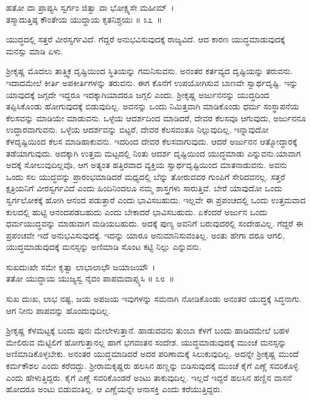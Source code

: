 \begin{shloka}
ಹತೋ ವಾ ಪ್ರಾಪ್ಯಸಿ ಸ್ವರ್ಗಂ ಜಿತ್ವಾ ವಾ ಭೋಕ್ಷ್ಯಸೇ ಮಹೀಮ್~।\\ತಸ್ಮಾದುತ್ತಿಷ್ಠ ಕೌಂತೇಯ ಯುದ್ಧಾಯ ಕೃತನಿಶ್ಚಯಃ \hfill॥ ೩೭~॥
\end{shloka}

\begin{artha}
ಯುದ್ಧದಲ್ಲಿ ಸತ್ತರೆ ವೀರಸ್ವರ್ಗವಿದೆ. ಗೆದ್ದರೆ ಅನುಭವಿಸುವುದಕ್ಕೆ ರಾಜ್ಯವಿದೆ. ಆದ ಕಾರಣ ಯುದ್ಧಮಾಡುವುದಕ್ಕೆ ಮನಸ್ಸು ಮಾಡಿ ಏಳು.
\end{artha}

\newpage

ಶ‍್ರೀಕೃಷ್ಣ ಮೊದಲು ತಾತ್ತ್ವಿಕ ದೃಷ್ಟಿಯಿಂದ ಸ್ಥಿತಿಯನ್ನು ಗಮನಿಸುವನು. ಅನಂತರ ಕರ್ತವ್ಯದ ದೃಷ್ಟಿಯನ್ನು ತರುವನು. ಇದಾದಮೇಲೆ ಕೀರ್ತಿ ಅಪಕೀರ್ತಿಗಳನ್ನು ತರುವನು. ಈಗ ಕೊನೆಗೆ ಉಪಯೋಗಿಸುವ ಬಾಣವೇ ಸ್ವಾರ್ಥದೃಷ್ಟಿ. ಇನ್ನು ಯಾವುದಕ್ಕೆ ಜಗ್ಗದೇ ಇದ್ದರೂ ಇದಕ್ಕಾಗಿಯಾದರೂ ಜಗ್ಗಲಿ ಎಂದು. ಶ‍್ರೀಕೃಷ್ಣ ಅರ್ಜುನನನ್ನು ಯುದ್ಧದಿಂದ ತಪ್ಪಿಸಿಕೊಂಡು ಹೋಗುವುದಕ್ಕೆ ಬಿಡುವುದಿಲ್ಲ. ಅವನನ್ನು ಒಂದು ನಿಮಿತ್ತವಾಗಿ ಮಾಡಿಕೊಂಡು ಧರ್ಮ ಸಂಸ್ಥಾಪ\-ನೆಯ ಕೆಲಸವನ್ನು ಮಾಡಿಯೇ ಮಾಡುವನು. ಒಳ್ಳೆಯ ಆದರ್ಶದಿಂದ ಮಾಡಿದರೆ, ದೇವರ ಕೆಲಸವೂ ಆಗುವುದು, ಅರ್ಜುನನೂ ಉದ್ಧಾರವಾಗುವನು. ಒಳ್ಳೆಯ ಆದರ್ಶವನ್ನು ಬಿಟ್ಟರೆ, ದೇವರ ಕೆಲಸವಂತೂ ನಿಲ್ಲುವುದಿಲ್ಲ. ಇನ್ನಾವುದೋ ಕೆಳದೃಷ್ಟಿಯಿಂದ ಕೆಲಸ ಮಾಡಿಹಾಕುವನು. ಇದರಿಂದ ದೇವರ ಕೆಲಸವಾಗುವುದು. ಆದರೆ ಅರ್ಜುನನ ಆತ್ಮೋದ್ಧಾರಕ್ಕೆ ತಡೆಯಾಗುವುದು. ಅದಕ್ಕಾಗಿ ಉತ್ತಮ ಮಟ್ಟದಲ್ಲಿ ನಿಂತು ಆದರ್ಶ ದೃಷ್ಟಿಯಿಂದ ಯುದ್ಧಮಾಡು ಎನ್ನುವನು.\break ಯಾವಾಗ ಅದಕ್ಕೆ ಸೋಲುವುದಿಲ್ಲವೊ, ಆಗ ಅತ್ಯಂತ ಹತ್ತಿರವಾದ ವ್ಯಕ್ತಿಯ ಸ್ವಾರ್ಥದೃಷ್ಟಿಯಿಂದ ಮಾತನಾಡುವನು. ಅವನು ಒಂದು ಸಲ ಯುದ್ಧವನ್ನು ಪ್ರಾರಂಭಮಾಡಿದರೆ ಮಧ್ಯದಲ್ಲಿ ಬೆನ್ನು ತೋರುವವರ ಗುಂಪಿಗೆ ಸೇರಿದವನಲ್ಲ. ಸತ್ತರೆ ಕ್ಷತ್ರಿಯನಿಗೆ ವೀರಸ್ವರ್ಗವಿದೆ ಎಂದು ಹಿಂದಿನಿಂದಲೂ ನಮ್ಮ ಶಾಸ್ತ್ರಗಳು ಸಾರುತ್ತಿವೆ. ಬೇರೆ ಯಾವುದೋ ಒಂದು ಸ್ವರ್ಗಲೋಕಕ್ಕೆ ಹೋಗಿ ಆನಂದ ಪಡುತ್ತಾರೆ ಎಂದು ಭಾವಿಸಬಹುದು. ಇಲ್ಲವೇ ಈ ಪ್ರಪಂಚದಲ್ಲಿ ಒಂದು ಉತ್ತಮವಾದ ಕುಲದಲ್ಲಿ ಹುಟ್ಟಿ ಆನಂದಪಡಬಹುದು ಎಂದು ಬೇಕಾದರೆ ಭಾವಿಸಬಹುದು. ಏಕೆಂದರೆ ಅರ್ಜುನ ಒಂದು ಧರ್ಮಯುದ್ಧವನ್ನು ಮಾಡುವಾಗ ಮಡಿಯಬಹುದು. ಅದಕ್ಕೆ ಪುಣ್ಯ ಅವನಿಗೆ ಬರುವುದರಲ್ಲಿ ಸಂದೇಹವಿಲ್ಲ. ಗೆದ್ದರೆ ಈ ಪ್ರಪಂಚವೇ ಇದೆ ಅನುಭವಿಸುವುದಕ್ಕೆ. ಇದನ್ನು ಯಾರೂ ಅನುಮಾನಿಸುವಂತಿಲ್ಲ. ಅಂತು ಹೇಗಾ ದರೂ ಆಗಲಿ, ಯುದ್ಧಮಾಡುವುದಕ್ಕೆ ಮನಸ್ಸನ್ನು ಅಣಿಮಾಡಿ ಸೊಂಟ ಕಟ್ಟಿ ನಿಲ್ಲು ಎನ್ನುವನು.

\begin{shloka}
ಸುಖದುಃಖೇ ಸಮೇ ಕೃತ್ವಾ ಲಾಭಾಲಾಭೌ ಜಯಾಜಯೌ~।\\ತತೋ ಯುದ್ಧಾಯ ಯುಜ್ಯಸ್ವ ನೈವಂ ಪಾಪಮವಾಪ್ಸ್ಯಸಿ \hfill॥ ೩೮~॥
\end{shloka}

\begin{artha}
ಸುಖ ದುಃಖ, ಲಾಭ ನಷ್ಟ, ಜಯ ಅಪಜಯ ಇವುಗಳನ್ನು ಸಮನಾಗಿ ನೋಡಿಕೊಂಡು ಅನಂತರ ಯುದ್ಧಕ್ಕೆ ಸಿದ್ಧನಾಗು. ಆಗ ನೀನು ಪಾಪವನ್ನು ಹೊಂದುವುದಿಲ್ಲ.
\end{artha}

ಶ‍್ರೀಕೃಷ್ಣ ಕೆಳಮಟ್ಟಕ್ಕೆ ಬಂದು ಪುನಃ ಮೇಲೇಳುತ್ತಾನೆ. ಹಾಡುವವನು ತುಂಬಾ ಕೆಳಗೆ ಬಂದು ಹಾಡಿದಮೇಲೆ ಬಹಳ ಮೇಲಿರುವ ಮೆಟ್ಟಿಲಿಗೆ ಹೋಗುತ್ತಾನಲ್ಲ ಹಾಗೆ ಭಗವಂತನ ಸಂದೇಶ. ಯುದ್ಧಮಾಡುವುದಕ್ಕೆ ಮುಂಚೆ ಮನಸ್ಸನ್ನು ಅಣಿಮಾಡಿಕೊಳ್ಳಬೇಕು. ಅನಂತರ ಯುದ್ಧಮಾಡಿದರೆ ಅದರ ಪರಿಣಾಮಕ್ಕೆ ಸಿಲುಕುವುದಿಲ್ಲ. ಅದನ್ನೇ ಶ‍್ರೀಕೃಷ್ಣ ಮುಂದೆ ಕರ್ಮಕೌಶಲ ಎಂದು ಕರೆದದ್ದು. ಶ‍್ರೀರಾಮಕೃಷ್ಣರು ಹಲಸಿನ ಹಣ್ಣನ್ನು ಬಿಡಿಸುವುದಕ್ಕೆ ಮುಂಚೆ ಕೈಗೆ ಎಣ್ಣೆ ಸವರಿಕೊಳ್ಳಿ ಎಂದು ಹೇಳುತ್ತಿದ್ದರು. ಕೈಗೆ ಎಣ್ಣೆ ಸವರಿಕೊಂಡರೆ ಅಂಟು ತಾಕುವುದಿಲ್ಲ. ಇಲ್ಲದೆ ಇದ್ದರೆ ಹಲಸಿನ ಹಣ್ಣಿನ ವಾಸನೆ ಹೋದರೂ ಅಂಟು ಬಿಡುವಂತಿಲ್ಲ. ಆ ಎಣ್ಣೆಯನ್ನೇ ಅನಾಸಕ್ತಿ ಎಂದು ಕರೆಯುತ್ತಿದ್ದರು.

